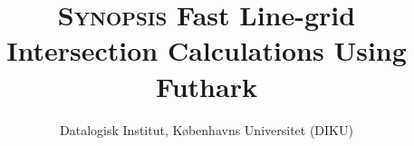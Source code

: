 
\usepackage{natbib}

\title{
    \vspace{5cm}
    \Huge{\textsc{Synopsis}}
    \linebreak
    \Large{Fast Line-grid Intersection Calculations Using Futhark}
}
\author{Datalogisk Institut, Københavns Universitet (DIKU)}



\tableofcontents





\pagebreak




